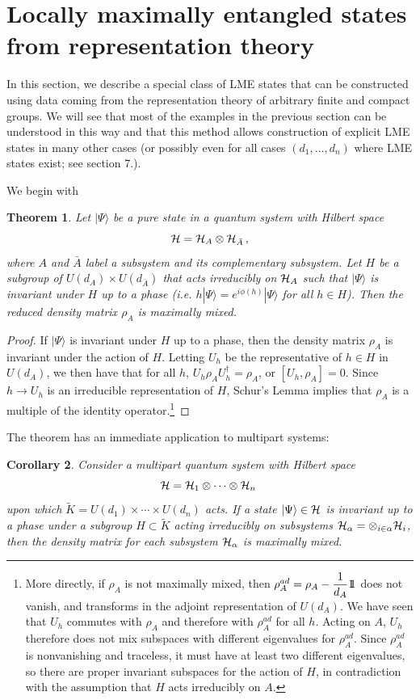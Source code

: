 \documentclass[12pt]{article}
\newtheorem{theorem}{Theorem}[section]
\newtheorem{corollary}[theorem]{Corollary}
\theoremstyle{definition}
\def\identity{{\rlap{1} \hskip 1.6pt \hbox{1}}}
\begin{document}
\section{Locally maximally entangled states from representation theory}

In this section, we describe a special class of LME states that can be constructed using data coming from the representation theory of arbitrary finite and compact groups. We will see that most of the examples in the previous section can be understood in this way and that this method allows construction of explicit LME states in many other cases (or possibly even for all cases $(d_1, \dots, d_n)$ where LME states exist; see section 7.).

We begin with
\begin{theorem}
Let $|\Psi \rangle$ be a pure state in a quantum system with Hilbert space
\[
{\cal H} = {\cal H}_A  \otimes {\cal H}_{\bar{A}} \, ,
\]
where $A$ and $\bar{A}$ label a subsystem and its complementary
subsystem. Let $H$ be a subgroup of $U(d_A) \times U(d_{\bar{A}})$
that acts irreducibly on ${\cal H}_A$ such that $|\Psi \rangle$ is
invariant under $H$ up to a phase (i.e. $h|\Psi \rangle = e^{i
\phi(h)}|\Psi \rangle$ for all $h \in H$). Then the reduced density
matrix $\rho_A$ is maximally mixed.
\end{theorem}
\begin{proof}
If $|\Psi \rangle$ is invariant under $H$ up to a phase, then the density matrix $\rho_A$ is invariant under the action of $H$. Letting $U_h$ be the representative of $h \in H$ in $U(d_A)$, we then have that for all $h$, $U_h \rho_A U_h^\dagger = \rho_A$, or $[U_h, \rho_A] = 0$. Since $h \to U_h$ is an irreducible representation of $H$, Schur's Lemma implies that $\rho_A$ is a multiple of the identity operator.\footnote{More directly, if $\rho_A$ is not maximally mixed, then $\rho_A^{ad} = \rho_A - \dfrac{1}{d_A} \identity$ does not vanish, and transforms in the adjoint representation of $U(d_A)$. We have seen that $U_h$ commutes with $\rho_A$ and therefore with $\rho^{ad}_A$ for all $h$. Acting on $A$, $U_h$ therefore does not mix subspaces with different eigenvalues for $\rho^{ad}_A$. Since $\rho^{ad}_A$ is nonvanishing and traceless, it must have at least two different eigenvalues, so there are proper invariant subspaces for the action of $H$, in contradiction with the assumption that $H$ acts irreducibly on $A$.}
\end{proof}
The theorem has an immediate application to multipart systems:
\begin{corollary}
\label{cor.multipart}
Consider a multipart quantum system with Hilbert space
\[
{\cal H} = {\cal H}_1  \otimes \cdots  \otimes {\cal H}_n \;
\]
upon which $\tilde{K} = U(d_1) \times \cdots \times U(d_n)$ acts. If a state $|\Psi \rangle \in {\cal H}$ is invariant up to a phase under a subgroup $H \subset \tilde{K}$ acting irreducibly on subsystems ${\cal H}_{\alpha} =  \otimes_{i \in \alpha} {\cal H}_i$, then the density matrix for each subsystem ${\cal H}_{\alpha}$ is maximally mixed.
\end{corollary}
\end{document}
